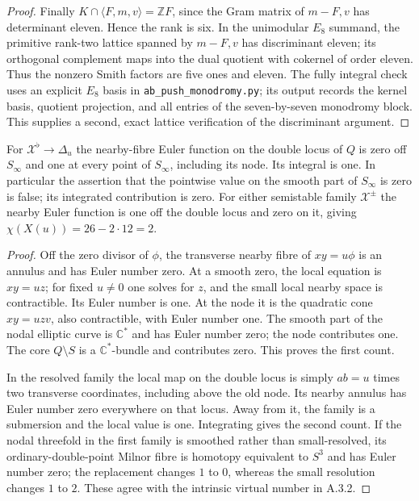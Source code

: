 \begin{proof}
Finally $K\cap\langle F,m,v\rangle=\mathbb ZF$, since
the Gram matrix of $m-F,v$ has determinant eleven.
Hence the rank is six. In the unimodular $E_8$ summand,
the primitive rank-two lattice spanned by $m-F,v$ has
discriminant eleven; its orthogonal complement maps into
the dual quotient with cokernel of order eleven. Thus the
nonzero Smith factors are five ones and eleven. The fully
integral check uses an explicit $E_8$ basis in
\texttt{ab\_push\_monodromy.py}; its output records the
kernel basis, quotient projection, and all entries of the
seven-by-seven monodromy block. This supplies a second,
exact lattice verification of the discriminant argument.
\end{proof}

\begin{proposition}\label{push:A43}
For $\mathcal X^\flat\to\Delta_u$ the nearby-fibre Euler
function on the double locus of $Q$ is zero off $S_\infty$
and one at every point of $S_\infty$, including its node.
Its integral is one. In particular the assertion that the
pointwise value on the smooth part of $S_\infty$ is zero
is false; its integrated contribution is zero.
For either semistable family $\mathcal X^\pm$ the nearby
Euler function is one off the double locus and zero on
it, giving $\chi(X(u))=26-2\cdot12=2$.
\end{proposition}
\begin{proof}
Off the zero divisor of $\phi$, the transverse nearby
fibre of $xy=u\phi$ is an annulus and has Euler number
zero. At a smooth zero, the local equation is $xy=uz$;
for fixed $u\ne0$ one solves for $z$, and the small
local nearby space is contractible. Its Euler number
is one. At the node it is the quadratic cone
$xy=uzv$, also contractible, with Euler number one.
The smooth part of the nodal elliptic curve is
$\mathbb C^*$ and has Euler number zero; the node
contributes one. The core $Q\setminus S$ is a
$\mathbb C^*$-bundle and contributes zero.
This proves the first count.

In the resolved family the local map on the double locus
is simply $ab=u$ times two transverse coordinates,
including above the old node. Its nearby annulus has
Euler number zero everywhere on that locus. Away from
it, the family is a submersion and the local value is
one. Integrating gives the second count. If the nodal
threefold in the first family is smoothed rather than
small-resolved, its ordinary-double-point Milnor fibre
is homotopy equivalent to $S^3$ and has Euler number
zero; the replacement changes $1$ to $0$, whereas
the small resolution changes $1$ to $2$. These agree
with the intrinsic virtual number in A.3.2.
\end{proof}

